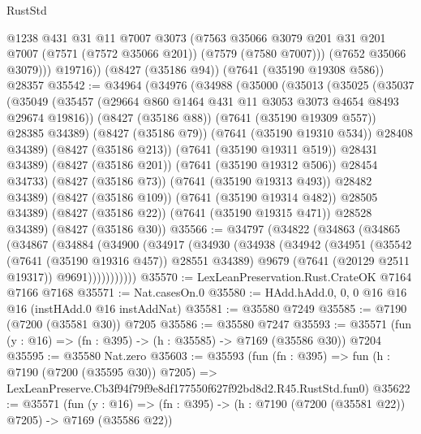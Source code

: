 \begin{lexlean}{RustStd}
\begin{coremodule}
            @1238
            @431
            @31
            @11
            @7007
            @3073
            (@7563
              @35066
              @3079
              @201
              @31
              @201
              @7007
              (@7571 (@7572 @35066 @201))
              (@7579 (@7580 @7007)))
            (@7652 @35066 @3079)))
        @19716))
    (@8427 (@35186 @94))
    (@7641 (@35190 @19308 @586))
    @28357
@35542 := @34964
    (@34976
      (@34988
        (@35000
          (@35013
            (@35025
              (@35037
                (@35049
                  (@35457 (@29664 @860 @1464 @431 @11 @3053 @3073 @4654 @8493 @29674 @19816))
                  (@8427 (@35186 @88))
                  (@7641 (@35190 @19309 @557))
                  @28385
                  @34389)
                (@8427 (@35186 @79))
                (@7641 (@35190 @19310 @534))
                @28408
                @34389)
              (@8427 (@35186 @213))
              (@7641 (@35190 @19311 @519))
              @28431
              @34389)
            (@8427 (@35186 @201))
            (@7641 (@35190 @19312 @506))
            @28454
            @34733)
          (@8427 (@35186 @73))
          (@7641 (@35190 @19313 @493))
          @28482
          @34389)
        (@8427 (@35186 @109))
        (@7641 (@35190 @19314 @482))
        @28505
        @34389)
      (@8427 (@35186 @22))
      (@7641 (@35190 @19315 @471))
      @28528
      @34389)
    (@8427 (@35186 @30))
@35566 := @34797
    (@34822
      (@34863
        (@34865
          (@34867
            (@34884
              (@34900
                (@34917
                  (@34930
                    (@34938
                      (@34942
                        (@34951
                          (@35542 (@7641 (@35190 @19316 @457)) @28551 @34389)
                          @9679
                          (@7641 (@20129 @2511 @19317))
                          @9691)))))))))))
@35570 := LexLeanPreservation.Rust.CrateOK @7164 @7166 @7168
@35571 := Nat.casesOn.{0}
@35580 := HAdd.hAdd.{0, 0, 0} @16 @16 @16 (instHAdd.{0} @16 instAddNat)
@35581 := @35580 @7249
@35585 := @7190 (@7200 (@35581 @30)) @7205
@35586 := @35580 @7247
@35593 := @35571 (fun (y : @16) => (fn : @395) -> (h : @35585) -> @7169 (@35586 @30)) @7204
@35595 := @35580 Nat.zero
@35603 := @35593
    (fun (fn : @395) =>
    fun (h : @7190 (@7200 (@35595 @30)) @7205) =>
    LexLeanPreserve.Cb3f94f79f9e8df177550f627f92bd8d2.R45.RustStd.fun0)
@35622 := @35571
    (fun (y : @16) => (fn : @395) -> (h : @7190 (@7200 (@35581 @22)) @7205) -> @7169 (@35586 @22))

\end{coremodule}
\end{lexlean}
